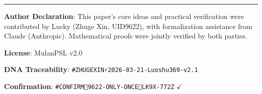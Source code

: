 \documentclass[conference]{IEEEtran}
\theoremstyle{remark}
\begin{document}
\vspace{12pt}
\begin{center}
\rule{0.6\linewidth}{0.4pt}

\vspace{6pt}
\textbf{Author Declaration}: This paper's core ideas and practical verification were contributed by Lucky (Zhuge Xin, UID9622), with formalization assistance from Claude (Anthropic). Mathematical proofs were jointly verified by both parties.

\vspace{4pt}
\textbf{License}: MulanPSL v2.0

\vspace{4pt}
\textbf{DNA Traceability}: \texttt{\#ZHUGEXIN⚡️2026-03-21-Luoshu369-v2.1}

\vspace{4pt}
\textbf{Confirmation}: \texttt{\#CONFIRM🌌9622-ONLY-ONCE🧬LK9X-772Z} $\checkmark$
\end{center}
\end{document}
